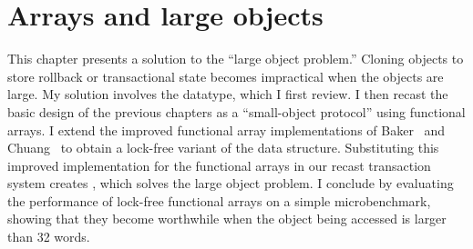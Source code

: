 

\chapter{Arrays and large objects}\label{cha:largeobj}
\setlength{\epigraphwidth}{.55\textwidth}

This chapter presents a solution to the ``large object problem.''
Cloning objects to store rollback or transactional state becomes
impractical when the objects are large.  My solution involves
the  datatype, which I first review.
I then recast the basic \apex design of the previous
chapters as a ``small-object protocol'' using \naive functional arrays.
I extend the improved functional array implementations of
Baker~\cite{Baker91} and Chuang~\cite{Chuang94} to obtain a
lock-free variant of the data structure.
Substituting this improved implementation for the \naive functional
arrays in our recast transaction system creates \lapex, which solves
the large object problem.  I conclude by evaluating the
performance of lock-free functional arrays on a simple
microbenchmark, showing that they become worthwhile when the object
being accessed is larger than 32 words.


